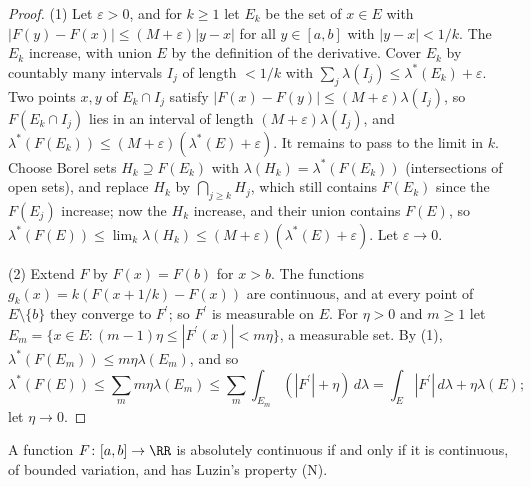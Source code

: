 \begin{proof}
(1) Let $\varepsilon > 0$, and for $k \geq 1$ let $E_k$ be the set of $x \in E$ with $|F(y) - F(x)| \leq (M + \varepsilon)|y - x|$ for all $y \in [a, b]$ with $|y - x| < 1/k$. The $E_k$ increase, with union $E$ by
the definition of the derivative. Cover $E_k$ by countably many intervals $I_j$ of length $< 1/k$ with $\sum_j\lambda(I_j) \leq \lambda^*(E_k) + \varepsilon$. Two points $x, y$ of $E_k \cap I_j$ satisfy
$|F(x) - F(y)| \leq (M + \varepsilon)\lambda(I_j)$, so $F(E_k \cap I_j)$ lies in an interval of length $(M + \varepsilon)\lambda(I_j)$, and
$\lambda^*(F(E_k)) \leq (M + \varepsilon)(\lambda^*(E) + \varepsilon)$. It remains to pass to the limit in $k$. Choose Borel sets $H_k \supseteq F(E_k)$ with $\lambda(H_k) = \lambda^*(F(E_k))$ (intersections of
open sets), and replace $H_k$ by $\bigcap_{j \geq k}H_j$, which still contains $F(E_k)$ since the $F(E_j)$ increase; now the $H_k$ increase, and their union contains $F(E)$, so
$\lambda^*(F(E)) \leq \lim_k\lambda(H_k) \leq (M + \varepsilon)(\lambda^*(E) + \varepsilon)$. Let $\varepsilon \to 0$.

(2) Extend $F$ by $F(x) = F(b)$ for $x > b$. The functions $g_k(x) = k(F(x + 1/k) - F(x))$ are continuous, and at every point of $E \setminus \{b\}$ they converge to $F^{\prime}$; so $F^{\prime}$ is
measurable on $E$. For $\eta > 0$ and $m \geq 1$ let $E_m = \{x \in E : (m - 1)\eta \leq |F^{\prime}(x)| < m\eta\}$, a measurable set. By (1), $\lambda^*(F(E_m)) \leq m\eta\lambda(E_m)$, and so
\[
\lambda^*(F(E)) \leq \sum_m m\eta\lambda(E_m) \leq \sum_m\int_{E_m}(|F^{\prime}| + \eta)\,d\lambda = \int_E|F^{\prime}|\,d\lambda + \eta\lambda(E);
\]
let $\eta \to 0$.
\end{proof}
\begin{theorem}\label{lebesgue-differentiation:theorem-banach-zarecki}
A function $F \colon [a, b] \to \RR$ is absolutely continuous if and only if it is continuous, of bounded variation, and has Luzin's property (N).
\end{theorem}

